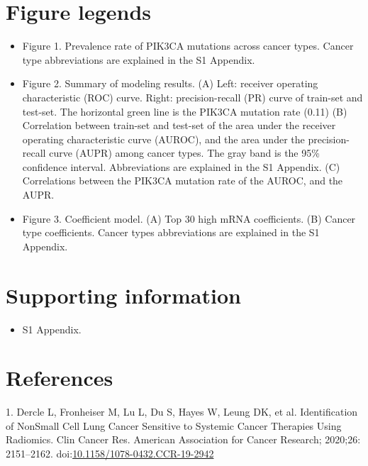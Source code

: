 \documentclass[10pt,letterpaper]{article}
\providecommand{\tightlist}{%
  \setlength{\itemsep}{0pt}\setlength{\parskip}{0pt}}
\begin{document}
\hypertarget{figure-legends}{%
\section{Figure legends}\label{figure-legends}}

\begin{itemize}
\item
  Figure 1. Prevalence rate of PIK3CA mutations across cancer types.
  Cancer type abbreviations are explained in the S1 Appendix.
\item
  Figure 2. Summary of modeling results. (A) Left: receiver operating
  characteristic (ROC) curve. Right: precision-recall (PR) curve of
  train-set and test-set. The horizontal green line is the PIK3CA
  mutation rate (0.11) (B) Correlation between train-set and test-set of
  the area under the receiver operating characteristic curve (AUROC),
  and the area under the precision-recall curve (AUPR) among cancer
  types. The gray band is the 95\% confidence interval. Abbreviations
  are explained in the S1 Appendix. (C) Correlations between the PIK3CA
  mutation rate of the AUROC, and the AUPR.
\item
  Figure 3. Coefficient model. (A) Top 30 high mRNA coefficients. (B)
  Cancer type coefficients. Cancer types abbreviations are explained in
  the S1 Appendix.
\end{itemize}

\hypertarget{supporting-information}{%
\section{Supporting information}\label{supporting-information}}

\begin{itemize}
\tightlist
\item
  S1 Appendix.
\end{itemize}

\hypertarget{references}{%
\section*{References}\label{references}}

\hypertarget{refs}{}
\leavevmode\hypertarget{ref-dercleIdentificationNonSmall2020}{}%
1. Dercle L, Fronheiser M, Lu L, Du S, Hayes W, Leung DK, et al.
Identification of NonSmall Cell Lung Cancer Sensitive to Systemic Cancer
Therapies Using Radiomics. Clin Cancer Res. American Association for
Cancer Research; 2020;26: 2151--2162.
doi:\href{https://doi.org/10.1158/1078-0432.CCR-19-2942}{10.1158/1078-0432.CCR-19-2942}
\end{document}
